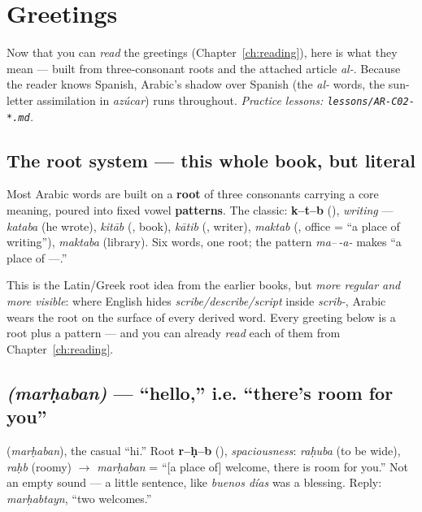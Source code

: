 \chapter{Greetings}
\label{ch:greetings}

Now that you can \emph{read} the greetings (Chapter~\ref{ch:reading}), here is
what they mean --- built from three-consonant roots and the attached article
\emph{al-}. Because the reader knows Spanish, Arabic's shadow over Spanish (the
\emph{al-} words, the sun-letter assimilation in \emph{az\'{u}car}) runs
throughout. \emph{Practice lessons: \texttt{lessons/AR-C02-*.md}.}

\section{The root system --- this whole book, but literal}
\label{lesson:root-system}

Most Arabic words are built on a \textbf{root} of three consonants carrying a
core meaning, poured into fixed vowel \textbf{patterns}. The classic:
\textbf{k--t--b} (), \emph{writing} --- \emph{kataba} (he wrote),
\emph{kit\=ab} (, book), \emph{k\=atib} (, writer),
\emph{maktab} (, office = ``a place of writing''), \emph{maktaba}
(library). Six words, one root; the pattern \emph{ma--\,-a-} makes ``a place
of ---.''

\begin{cousinweb}
This is the Latin/Greek root idea from the earlier books, but \emph{more
regular and more visible}: where English hides \emph{scribe/describe/script}
inside \emph{scrib-}, Arabic wears the root on the surface of every derived
word. Every greeting below is a root plus a pattern --- and you can already
\emph{read} each of them from Chapter~\ref{ch:reading}.
\end{cousinweb}

\section{ \emph{(mar\d{h}aban)} --- ``hello,'' i.e. ``there's room for you''}
\label{lesson:marhaba}

\begin{cousinweb}
 (\emph{mar\d{h}aban}), the casual ``hi.'' Root \textbf{r--\d{h}--b}
(), \emph{spaciousness}: \emph{ra\d{h}uba} (to be wide), \emph{ra\d{h}b}
(roomy) $\to$ \emph{mar\d{h}aban} = ``[a place of] welcome, there is room for
you.'' Not an empty sound --- a little sentence, like \emph{buenos d\'{i}as}
was a blessing. Reply: \emph{mar\d{h}abtayn}, ``two welcomes.''
\end{cousinweb}

